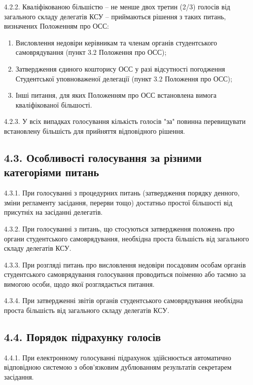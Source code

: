     4.2.2. Кваліфікованою більшістю -- не менше двох третин (2/3) голосів від загального складу делегатів КСУ -- приймаються рішення з таких питань, визначених Положенням про ОСС:

        \begin{enumerate}[label=\alph*)]
            \item Висловлення недовіри керівникам та членам органів студентського самоврядування (пункт 3.2 Положення про ОСС);
            \item Затвердження єдиного кошторису ОСС у разі відсутності погодження Студентської уповноваженої делегації (пункт 3.2 Положення про ОСС);
            \item Інші питання, для яких Положенням про ОСС встановлена вимога кваліфікованої більшості.
        \end{enumerate}

    4.2.3. У всіх випадках голосування кількість голосів "за" повинна перевищувати встановлену більшість для прийняття відповідного рішення.

\subsection*{4.3. Особливості голосування за різними категоріями питань}
    4.3.1. При голосуванні з процедурних питань (затвердження порядку денного, зміни регламенту засідання, перерви тощо) достатньо простої більшості від присутніх на засіданні делегатів.

    4.3.2. При голосуванні з питань, що стосуються затвердження положень про органи студентського самоврядування, необхідна проста більшість від загального складу делегатів КСУ.

    4.3.3. При розгляді питань про висловлення недовіри посадовим особам органів студентського самоврядування голосування проводиться поіменно або таємно за вимогою особи, щодо якої розглядається питання.

    4.3.4. При затвердженні звітів органів студентського самоврядування необхідна проста більшість від загального складу делегатів КСУ.

\subsection*{4.4. Порядок підрахунку голосів}
    4.4.1. При електронному голосуванні підрахунок здійснюється автоматично відповідною системою з обов'язковим дублюванням результатів секретарем засідання.

